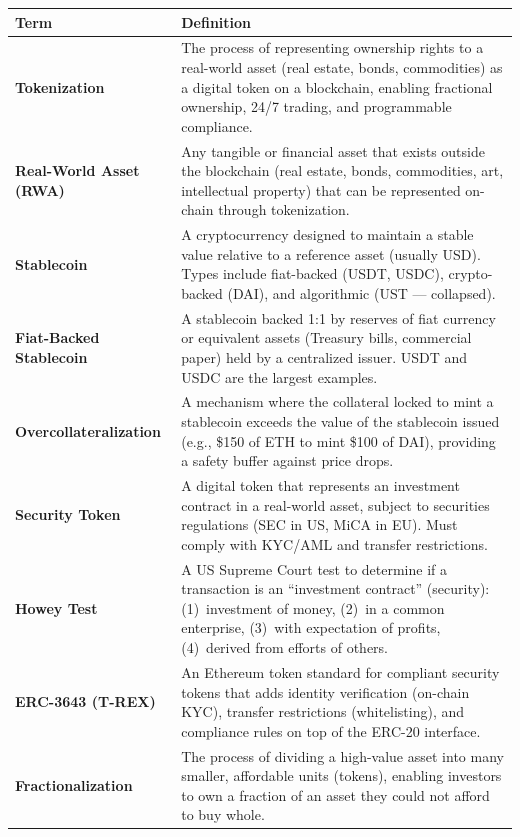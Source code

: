 \documentclass[11pt,a4paper]{article}
\begin{document}
\renewcommand{\arraystretch}{1.25}
\noindent\begin{tabular}{@{}p{3.6cm}p{11.0cm}@{}}
\toprule
\textbf{Term} & \textbf{Definition} \\
\midrule
\textbf{Tokenization}              & The process of representing ownership rights to a real-world asset (real estate, bonds, commodities) as a digital token on a blockchain, enabling fractional ownership, 24/7 trading, and programmable compliance. \\
\textbf{Real-World Asset (RWA)}    & Any tangible or financial asset that exists outside the blockchain (real estate, bonds, commodities, art, intellectual property) that can be represented on-chain through tokenization. \\
\textbf{Stablecoin}                & A cryptocurrency designed to maintain a stable value relative to a reference asset (usually USD). Types include fiat-backed (USDT, USDC), crypto-backed (DAI), and algorithmic (UST --- collapsed). \\
\textbf{Fiat-Backed Stablecoin}    & A stablecoin backed 1:1 by reserves of fiat currency or equivalent assets (Treasury bills, commercial paper) held by a centralized issuer. USDT and USDC are the largest examples. \\
\textbf{Overcollateralization}     & A mechanism where the collateral locked to mint a stablecoin exceeds the value of the stablecoin issued (e.g., \$150 of ETH to mint \$100 of DAI), providing a safety buffer against price drops. \\
\textbf{Security Token}            & A digital token that represents an investment contract in a real-world asset, subject to securities regulations (SEC in US, MiCA in EU). Must comply with KYC/AML and transfer restrictions. \\
\textbf{Howey Test}                & A US Supreme Court test to determine if a transaction is an ``investment contract'' (security): (1)~investment of money, (2)~in a common enterprise, (3)~with expectation of profits, (4)~derived from efforts of others. \\
\textbf{ERC-3643 (T-REX)}          & An Ethereum token standard for compliant security tokens that adds identity verification (on-chain KYC), transfer restrictions (whitelisting), and compliance rules on top of the ERC-20 interface. \\
\textbf{Fractionalization}         & The process of dividing a high-value asset into many smaller, affordable units (tokens), enabling investors to own a fraction of an asset they could not afford to buy whole. \\

\end{tabular}
\end{document}
